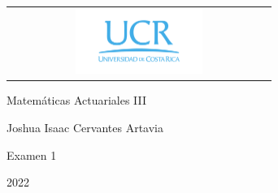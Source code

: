 \hypersetup{pageanchor=false}
\begin{titlepage}

\Large
\sffamily

\begin{center}
  \begin{tabular}{c}
    \includegraphics[width=0.5\textwidth]{./firma-ucr-ico.png}
  \end{tabular}
\end{center}

\vfill
\begin{center}
  \huge Matemáticas Actuariales III
\vspace{24pt}\\
\textcolor{gray}{\small{}}
\end{center}

\vspace*{2cm}
\centerline{\huge Joshua Isaac Cervantes Artavia}

\vfill

\begin{center}
  \large Examen 1 \\
\end{center}

\vfill

\centerline{2022}
\end{titlepage}
\hypersetup{pageanchor=true}